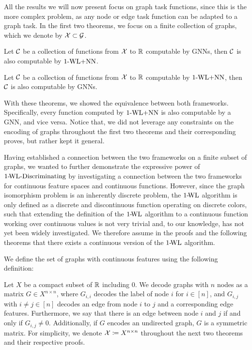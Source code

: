 All the results we will now present focus on graph task functions, since this is the more complex problem, as any node or edge task function can be adapted to a graph task. In the first two theorems, we focus on a finite collection of graphs, which we denote by $\mathcal{X} \subset \mathcal{G}$.

\begin{theorem}\label{theorem:1wl_in_gnn}
    Let $\mathcal{C}$ be a collection of functions from $\mathcal{X}$ to $\mathbb{R}$ computable by GNNs, then $\mathcal{C}$ is also computable by $\text{1-WL+NN}$.
\end{theorem}

\begin{theorem}\label{theorem:gnn_in_1wl}
    Let $\mathcal{C}$ be a collection of functions from $\mathcal{X}$ to $\mathbb{R}$ computable by $\text{1-WL+NN}$, then $\mathcal{C}$ is also computable by GNNs.
\end{theorem}
With these theorems, we showed the equivalence between both frameworks. Specifically, every function computed by $\text{1-WL+NN}$ is also computable by a GNN, and vice versa. Notice that, we did not leverage any constraints on the encoding of graphs throughout the first two theorems and their corresponding proves, but rather kept it general. 

Having established a connection between the two frameworks on a finite subset of graphs, we wanted to further demonstrate the expressive power of $\text{1-\!WL-Discriminating}$ by investigating a connection between the two frameworks for continuous feature spaces and continuous functions. However, since the graph isomorphism problem is an inherently discrete problem, the $\text{1-\!WL}$ algorithm is only defined as a discrete and discontinuous function operating on discrete colors, such that extending the definition of the $\text{1-\!WL}$ algorithm to a continuous function working over continuous values is not very trivial and, to our knowledge, has not yet been widely investigated. We therefore assume in the proofs and the following theorems that there exists a continuous version of the $\text{1-\!WL}$ algorithm. 

We define the set of graphs with continuous features using the following definition:
\begin{definition}
    Let $X$ be a compact subset of $\mathbb{R}$ including $0$. We decode graphs with $n$ nodes as a matrix $G \in X^{n \times n}$, where $G_{i,i}$ decodes the label of node $i$ for $i \in [n]$, and $G_{i,j}$ with $i \neq j \in [n]$ decodes an edge from node $i$ to $j$ and a corresponding edge features. Furthermore, we say that there is an edge between node $i$ and $j$ if and only if $G_{i,j} \neq 0$. Additionally, if $G$ encodes an undirected graph, $G$ is a symmetric matrix. For simplicity, we denote $\mathcal{X} \coloneqq X^{n \times n}$ throughout the next two theorems and their respective proofs.
\end{definition}

